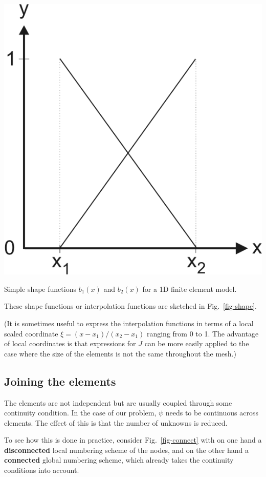 \begin{marginfigure}
\centering
\includegraphics{numeric/figures/interpol}
\caption{Simple shape functions $b_1(x)$ and $b_2(x)$ for a 1D finite element model.}
\label{fig-shape}
\end{marginfigure}

These shape functions or interpolation functions are sketched in Fig.~\ref{fig-shape}.

(It is sometimes useful to express the interpolation functions in terms of a local scaled coordinate $\xi=(x-x_1)/(x_2-x_1)$ ranging from 0 to 1. The advantage of local coordinates is that expressions for $J$ can be more easily applied to the case where the size of the elements is not the same throughout the mesh.)

\subsection{Joining the elements}

The elements are not independent but are usually coupled through some continuity condition. In the case of our problem, $\psi$ needs to be continuous across elements. The effect of this is that the number of unknowns is reduced.

To see how this is done in practice, consider Fig.~\ref{fig-connect}  with on one hand a \textbf{disconnected} local numbering scheme of the nodes, and on the other hand a \textbf{connected} global numbering scheme, which already takes the continuity conditions into account.

